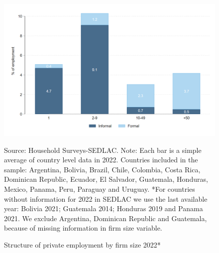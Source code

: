 \documentclass[english]{article}
\begin{document}
\begin{itemize}
            \begin{figure}[H]
                    \justifying
                    \caption{Structure of private employment by firm size 2022*}     \centerline{\includegraphics[scale=.3]{latex/figures/Snapshot/Employment and SS by firmsize_2022.png}}
                    \label{fig:firmsize2022}
                    \footnotesize{Source: Household Surveys-SEDLAC.}
                    \footnotesize{Note: Each bar is a simple average of country level data in 2022. Countries included in the sample: Argentina, Bolivia, Brazil, Chile, Colombia, Costa Rica, Dominican Republic, Ecuador, El Salvador, Guatemala, Honduras, Mexico, Panama, Peru, Paraguay and Uruguay. *For countries without information for 2022 in SEDLAC we use the last available year: Bolivia 2021; Guatemala 2014; Honduras 2019 and Panama 2021. We exclude Argentina, Dominican Republic and Guatemala, because of missing information in firm size variable.}
            \end{figure}


\end{itemize}
\end{document}
